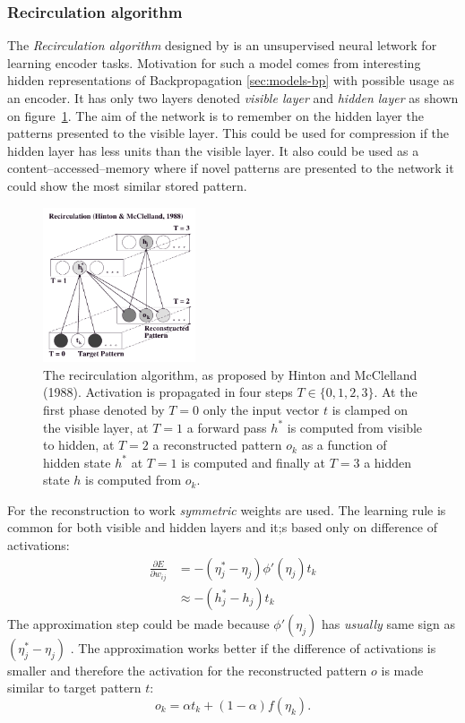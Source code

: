 \subsubsection{Recirculation algorithm}
\label{sec:models-recirc} 


The \emph{Recirculation algorithm} designed by \citet{hinton1988learning} is an unsupervised neural letwork for learning encoder tasks. Motivation for such a model comes from interesting hidden representations of Backpropagation \ref{sec:models-bp} with possible usage as an encoder. It has only two layers denoted \emph{visible layer} and \emph{hidden layer} as shown on figure~\ref{fig:models-recirc}. The aim of the network is to remember on the hidden layer the patterns presented to the visible layer. This could be used for compression if the hidden layer has less units than the visible layer. It also could be used as a content--accessed--memory where if novel patterns are presented to the network it could show the most similar stored pattern. 

\begin{figure}[h]
  \centering
\includegraphics[width=0.4\textwidth]{img/recirculation.png}
  \caption{The recirculation algorithm, as proposed by Hinton and McClelland (1988). Activation is propagated in four steps $T \in \{0,1,2,3\}$. At the first phase denoted by $T=0$ only the input vector $t$ is clamped on the visible layer, at $T=1$ a forward pass $h^{*}$ is computed from visible to hidden, at $T=2$ a reconstructed pattern $o_k$ as a function of hidden state $h^{*}$ at $T=1$ is computed and finally at $T=3$ a hidden state $h$ is computed from $o_k$.}
  \label{fig:models-recirc}
\end{figure}

For the reconstruction to work \emph{symmetric} weights are used. The learning rule is common for both visible and hidden layers and it;s based only on difference of activations: 
\begin{align}
\frac{\partial E}{\partial w_{ij}} &= -(\eta^{*}_j - \eta_j) \phi'(\eta_j) t_k \\
&\approx -(h^{*}_j - h_j)t_k
\end{align} 
The approximation step could be made because $\phi'(\eta_j)$ has \emph{usually} same sign as $(\eta^{*}_j - \eta_j) $ \citep{hinton1988learning, o1996bio}. The approximation works better if the difference of activations is smaller and therefore the activation for the reconstructed pattern $o$  is made similar to target pattern $t$: 
\begin{equation}
o_k = \alpha t_k + (1-\alpha)f(\eta_k). 
\end{equation} 

